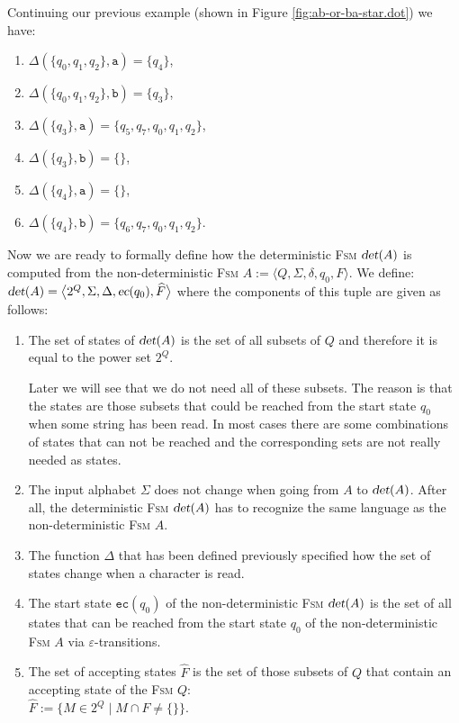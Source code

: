 \exampleEng
Continuing our previous example (shown in Figure \ref{fig:ab-or-ba-star.dot}) we have:
\begin{enumerate}
\item $\Delta(\{q_0, q_1, q_2\}, \texttt{a}) = \{ q_4 \}$,
\item $\Delta(\{q_0, q_1, q_2\}, \texttt{b}) = \{ q_3 \}$,
\item $\Delta(\{ q_3 \}, \texttt{a}) = \{ q_5, q_7, q_0, q_1, q_2 \}$,
\item $\Delta(\{ q_3 \}, \texttt{b}) = \{ \}$,
\item $\Delta(\{ q_4 \}, \texttt{a}) = \{ \}$,
\item $\Delta(\{ q_4 \}, \texttt{b}) = \{ q_6, q_7, q_0, q_1, q_2 \}$.
      \eox
\end{enumerate}
Now we are ready to formally define how the deterministic \textsc{Fsm} $\textsl{det}(A)$
is computed from the non-deterministic \textsc{Fsm}
$A := \bigl\langle Q, \Sigma, \delta, q_0, F \bigr\rangle$.
We define: 
\\[0.2cm]
\hspace*{1.3cm}
$\textsl{det}(A) = \bigl\langle 2^Q, \Sigma, \Delta, \textsl{ec}(q_0), \widehat{F} \bigr\rangle$
 where the components of this tuple are given as follows:
\begin{enumerate}
\item The set of states of $\textsl{det}(A)$ is the set of all subsets of $Q$ and therefore it is equal to the power set
      $2^Q$.

      Later we will see that we do not need all of these subsets.
      The reason is that the states are those subsets that could be reached from the start state $q_0$ 
      when some string has been read.  In most cases there are some combinations of states that can not be reached
      and the corresponding sets are not really needed as states.
\item The input alphabet $\Sigma$ does not change when going from $A$ to $\textsl{det}(A)$.
      After all, the deterministic \textsc{Fsm}  $\textsl{det}(A)$ 
      has to recognize the same language as the non-deterministic \textsc{Fsm} $A$.
\item The function $\Delta$ that has been defined previously specified how the set of states change when a
      character is read.
\item The start state $\texttt{ec}(q_0)$ of the non-deterministic \textsc{Fsm} $\textsl{det}(A)$ is the set of all states
      that can be reached from the start state $q_0$ of the non-deterministic \textsc{Fsm} $A$
      via $\varepsilon$-transitions.
\item The set of accepting states $\widehat{F}$ is the set of those subsets of $Q$ that contain an accepting
      state of the \textsc{Fsm} $Q$:
      \\[0.2cm]
      \hspace*{1.3cm}
      $\widehat{F} := \bigl\{ M \in 2^Q \mid M \cap F \not= \{\} \bigl\}$.
\end{enumerate}

